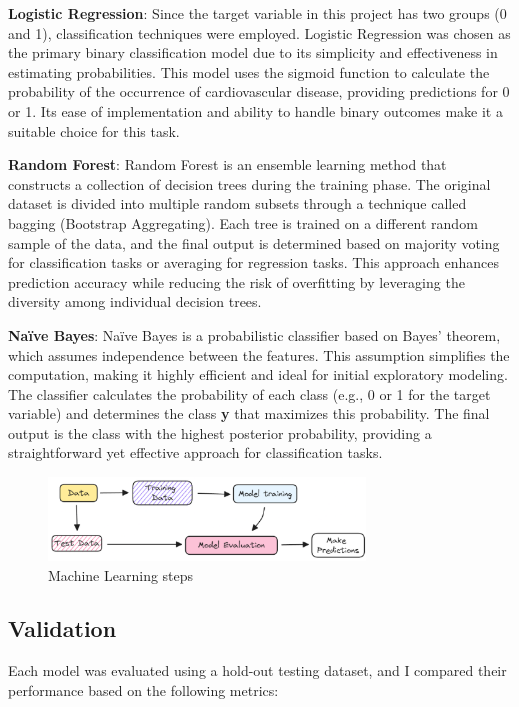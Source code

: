 \documentclass[12pt]{article}
\begin{document}
\textbf{Logistic Regression}: Since the target variable in this project has two groups (0 and 1), classification techniques were employed. Logistic Regression was chosen as the primary binary classification model due to its simplicity and effectiveness in estimating probabilities. This model uses the sigmoid function to calculate the probability of the occurrence of cardiovascular disease, providing predictions for 0 or 1. Its ease of implementation and ability to handle binary outcomes make it a suitable choice for this task.

\textbf{Random Forest}: Random Forest is an ensemble learning method that constructs a collection of decision trees during the training phase. The original dataset is divided into multiple random subsets through a technique called bagging (Bootstrap Aggregating). Each tree is trained on a different random sample of the data, and the final output is determined based on majority voting for classification tasks or averaging for regression tasks. This approach enhances prediction accuracy while reducing the risk of overfitting by leveraging the diversity among individual decision trees.

\textbf{Naïve Bayes}: Naïve Bayes is a probabilistic classifier based on Bayes' theorem, which assumes independence between the features. This assumption simplifies the computation, making it highly efficient and ideal for initial exploratory modeling. The classifier calculates the probability of each class (e.g., 0 or 1 for the target variable) and determines the class \textbf{y} that maximizes this probability. The final output is the class with the highest posterior probability, providing a straightforward yet effective approach for classification tasks.

\begin{figure}[H]
\centering
\captionsetup{font=small}
\includegraphics[width=0.75\textwidth]{ml.eps} 
\caption{Machine Learning steps}
\label{fig:ML}
\end{figure}

\subsection{Validation}
Each model was evaluated using a hold-out testing dataset, and I compared their performance based on the following metrics:
\end{document}
